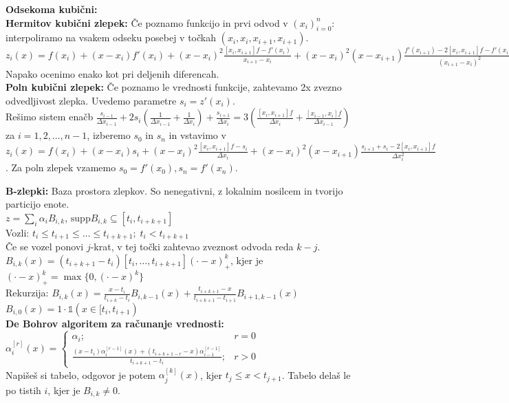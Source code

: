 \documentclass[a4paper,12pt]{article}
\theoremstyle{definition}
\begin{document}
\textbf{Odsekoma kubični:}\\
\textbf{Hermitov kubični zlepek:} Če poznamo funkcijo in prvi odvod v
$(x_i)_{i=0}^n$: interpoliramo na vsakem odseku posebej v
točkah $(x_i, x_i, x_{i+1}, x_{i+1})$.\\
$z_i(x) = f(x_i) + (x-x_i) f'(x_i) + (x-x_i)^2 \frac{[x_i, x_{i+1}]f -
f'(x_i)}{x_{i+1} - x_i} + (x-x_i)^2 (x-x_{i+1}) \frac{f'(x_{i+1}) - 2 [x_i,
x_{i+1}]f - f'(x_i)}{(x_{i+1} - x_i)^2}$\\
Napako ocenimo enako kot pri deljenih diferencah.\\
\textbf{Poln kubični zlepek:} Če poznamo le vrednosti funkcije, zahtevamo 2x
zvezno odvedljivost zlepka. Uvedemo parametre $s_i = z'(x_i)$. \\
Rešimo sistem enačb $\frac{s_{i-1}}{\Delta x_{i-1}} + 2 s_i
\left(\frac{1}{\Delta x_{i-1}} + \frac{1}{\Delta x_i}\right) +
\frac{s_{i+1}}{\Delta x_i} = 3\left(\frac{[x_i, x_{i+1}]f}{\Delta x_i} +
\frac{[x_{i-1}, x_i]f}{\Delta x_{i-1}}\right)$ za $i=1,2,\ldots,n-1$, izberemo
$s_0$ in $s_n$ in vstavimo v $z_i(x) = f(x_i) + (x-x_i)s_i +
(x-x_i)^2\frac{[x_i, x_{i+1}]f - s_i}{\Delta x_i} +
(x-x_i)^2(x-x_{i+1})\frac{s_{i+1} + s_i - 2[x_i, x_{i+1}]f}{\Delta x_i^2}$. Za
poln zlepek vzamemo $s_0 = f'(x_0), s_n = f'(x_n)$.

\textbf{B-zlepki:} Baza prostora zlepkov. So nenegativni, z lokalnim nosilcem
in tvorijo particijo enote.\\
$z = \sum_i \alpha_i B_{i,k}$, $\text{supp} B_{i,k} \subseteq [t_i, t_{i+k+1}]$\\
Vozli: $t_i \leq t_{i+1} \leq \ldots \leq t_{i+k+1}; \; t_i < t_{i+k+1}$\\
Če se vozel ponovi $j$-krat, v tej točki zahtevao zveznost odvoda reda $k-j$.\\
$B_{i,k} (x) = (t_{i+k+1} - t_i) [t_i, \ldots, t_{i+k+1}](\cdot - x)_+^k$, kjer
je $(\cdot - x)_+^k = \max\{0, (\cdot - x)^k\}$\\ Rekurzija: $B_{i,k}(x) =
\frac{x-t_i}{t_{i+k}-t_i} B_{i, k-1} (x) + \frac{t_{i+k+1} - x}{t_{i+k+1} -
t_{i+1}} B_{i+1, k-1} (x)$\\ $B_{i,0} (x) = 1 \cdot \mathbb{1}(x \in [t_i,
t_{i+1})$\\ \textbf{De Bohrov algoritem za računanje vrednosti:}
$\alpha_i^{[r]} (x) =
\begin{cases}
\alpha_i ;& r = 0\\
\frac{(x-t_i) \alpha_i^{[r-1]} (x) + (t_{i+k+1-r} - x) \alpha_{i-1}^{[r-1]}}{t_{i+k+1} - t_i};& r > 0
\end{cases}$\\
Napišeš si tabelo, odgovor je potem $\alpha_j^{[k]}(x)$, kjer $t_j \leq x <
t_{j+1}$. Tabelo delaš le po tistih $i$, kjer je $B_{i,k} \neq 0$. %
\end{document}
